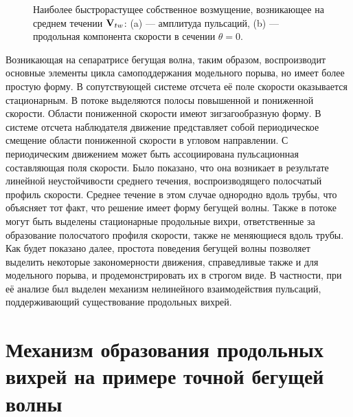 \begin{figure}
\caption{Наиболее быстрорастущее собственное возмущение, возникающее на среднем течении $\mathbf{V}_{tw}$: (a) --- амплитуда пульсаций, (b) --- продольная компонента скорости в сечении $\theta = 0$. }
\label{pipetw_lin_pic}
\end{figure}



Возникающая на сепаратрисе бегущая волна, таким образом, воспроизводит основные элементы цикла самоподдержания модельного порыва, но имеет более простую форму. В сопутствующей системе отсчета её поле скорости оказывается стационарным. В потоке выделяются полосы повышенной и пониженной скорости. Области пониженной скорости имеют зигзагообразную форму. В системе отсчета наблюдателя движение представляет собой периодическое смещение области пониженной скорости в угловом направлении. С периодическим движением может быть ассоциирована пульсационная составляющая поля скорости. Было показано, что она возникает в результате линейной неустойчивости среднего течения, воспроизводящего полосчатый профиль скорости. Среднее течение в этом случае однородно вдоль трубы, что объясняет тот факт, что решение имеет форму бегущей волны. Также в потоке могут быть выделены стационарные продольные вихри, ответственные за образование полосчатого профиля скорости, также не меняющиеся вдоль трубы. Как будет показано далее, простота поведения бегущей волны позволяет выделить некоторые закономерности движения, справедливые также и для модельного порыва, и продемонстрировать их в строгом виде. В частности, при её анализе был выделен механизм нелинейного взаимодействия пульсаций, поддерживающий существование продольных вихрей. 


\section{Механизм образования продольных вихрей на примере точной бегущей волны}

